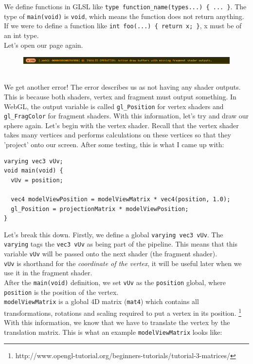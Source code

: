 We define functions in GLSL like \verb|type function_name(types...) { ... }|. The type of \verb|main(void)| is \verb|void|, which means the function does not return anything. If we were to define a function like \verb|int foo(...) { return x; }|, x must be of an int type. \\
Let's open our page again.
\begin{figure}[h]
\centering
\includegraphics[width=0.7\linewidth]{images/shader_output2}
\caption{}
\label{fig:shaderoutput2}
\end{figure} \\
We get another error! The error describes us as not having any shader outputs. This is because both shaders, vertex and fragment must output something. In WebGL, the output variable is called \verb|gl_Position| for vertex shaders and \verb|gl_FragColor| for fragment shaders. With this information, let's try and draw our sphere again.
\newpage
Let's begin with the vertex shader. Recall that the vertex shader takes many vertices and performs calculations on these vertices so that they 'project' onto our screen. After some testing, this is what I came up with:
\begin{lstlisting}
varying vec3 vUv;
void main(void) {
  vUv = position;

  vec4 modelViewPosition = modelViewMatrix * vec4(position, 1.0);
  gl_Position = projectionMatrix * modelViewPosition;
}
\end{lstlisting}
Let's break this down. Firstly, we define a global \verb|varying vec3 vUv|. The \verb|varying| tags the \verb|vec3 vUv| as being part of the pipeline. This means that this variable \verb|vUv| will be passed onto the next shader (the fragment shader). \\
\verb|vUv| is shorthand for the \textit{coordinate of the vertex}, it will be useful later when we use it in the fragment shader. \\
After the \verb|main(void)| definition, we set \verb|vUv| as the \verb|position| global, where \verb|position| is the position of the vertex. \\
\verb|modelViewMatrix| is a global 4D matrix (\verb|mat4|) which contains all transformations, rotations and scaling required to put a vertex in its position.
\footnote{http://www.opengl-tutorial.org/beginners-tutorials/tutorial-3-matrices/} \\
With this information, we know that we have to translate the vertex by the translation matrix. This is what an example \verb|modelViewMatrix| looks like:
